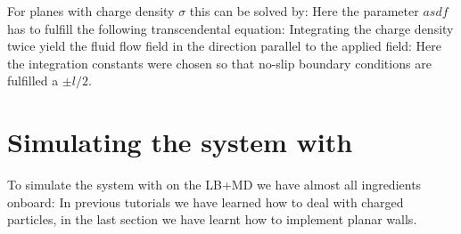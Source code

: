 For planes with charge density $\sigma$ this can be solved by:
Here the parameter $asdf$ has to fulfill the following transcendental
equation:
Integrating the charge density twice yield the fluid flow field
in the direction parallel to the applied field:
Here the integration constants were chosen so that no-slip boundary
conditions are fulfilled a $\pm l/2$.
\section{Simulating the system with \ES{}}
To simulate the system with on the LB+MD we have almost all
ingredients onboard: In previous tutorials we have learned how
to deal with charged particles, in the last section
we have learnt how to implement planar walls.


